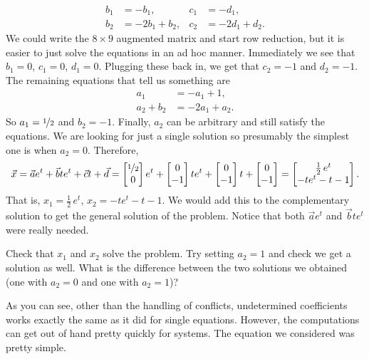\begin{example}
\begin{align*}
b_1 & = -b_1 , &
c_1 & = -d_1 , \\
b_2 & = -2b_1+b_2 , &
c_2 & = -2d_1+d_2 .
\end{align*}
We could write the $8 \times 9$ augmented matrix and start row
reduction, but it is easier to just solve the equations in an ad hoc
manner. Immediately we see that $b_1 = 0$, $c_1 = 0$, $d_1 = 0$.  Plugging
these
back in, we get that $c_2 = -1$ and $d_2 = -1$.  The remaining equations
that tell us something are
\begin{align*}
a_1 & = -a_1+1 , \\
a_2+b_2 & = -2a_1+a_2 .
\end{align*}
So $a_1 = \nicefrac{1}{2}$ and $b_2 = -1$.  Finally, $a_2$ can be arbitrary and still satisfy the
equations.  We are looking for just a single solution so presumably the
simplest
one is when $a_2 = 0$.
Therefore,
\begin{equation*}
\vec{x} = 
\vec{a}
e^{t}
+
\vec{b}
t
e^{t}
+
\vec{c}
t +
\vec{d}
=
\begin{bmatrix}
\nicefrac{1}{2} \\ 0
\end{bmatrix}
e^t
+
\begin{bmatrix}
0 \\ -1
\end{bmatrix}
te^t
+
\begin{bmatrix}
0 \\ -1
\end{bmatrix}
t
+
\begin{bmatrix}
0 \\ -1
\end{bmatrix}
=
\begin{bmatrix}
\frac{1}{2}\,e^t \\
-te^t - t - 1
\end{bmatrix} .
\end{equation*}
That is, $x_1 = \frac{1}{2}\,e^t$, $x_2 = 
-te^t - t - 1$.  We would add this to the complementary solution to get the
general solution of the problem.  Notice that both $\vec{a} e^t$
and $\vec{b} te^t$ were really needed.
\end{example}

\begin{exercise}
Check that $x_1$ and $x_2$ solve the problem.  Try setting $a_2 = 1$
and check we get a solution as well.  What is the difference between the two
solutions we obtained (one with $a_2=0$ and one with $a_2=1$)?
\end{exercise}

As you can see, other than the handling of conflicts, undetermined
coefficients works exactly the same as it did for
single equations.  However, the computations can get out of hand pretty
quickly for systems.  The equation we considered was pretty simple.

